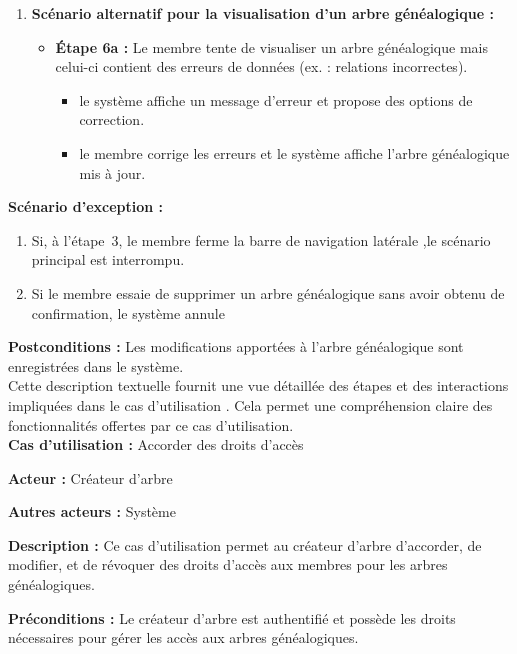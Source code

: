 \begin{enumerate}
    \item \textbf{Scénario alternatif pour la visualisation d'un arbre généalogique :}
    \begin{itemize}
        \item \textbf{Étape 6a :} Le membre tente de visualiser un arbre
          généalogique mais celui-ci contient des erreurs de données (ex. : relations incorrectes).
        \begin{itemize}
            \item le système affiche un message d'erreur et propose des options de correction.
            \item le membre corrige les erreurs et le système affiche l'arbre généalogique mis à jour.
        \end{itemize}
    \end{itemize}

\end{enumerate}

\textbf{Scénario d'exception :}
\begin{enumerate}
  \item Si, à l’étape 3, le membre ferme la barre de navigation latérale
    ,le scénario principal est interrompu.

  \item Si le membre essaie de supprimer un arbre généalogique sans avoir
    obtenu de confirmation, le système annule
\end{enumerate}

\textbf{Postconditions :} Les modifications apportées à l'arbre généalogique
sont enregistrées dans le système.
\\

Cette description textuelle fournit une vue détaillée des étapes et des
interactions impliquées dans le cas d’utilisation .
Cela permet une compréhension claire des fonctionnalités offertes par ce cas
d’utilisation.
\\

\textbf{Cas d’utilisation :} Accorder des droits d’accès

\textbf{Acteur :} Créateur d'arbre

\textbf{Autres acteurs :} Système

\textbf{Description :} Ce cas d’utilisation permet au créateur d'arbre d'accorder,
de modifier, et de révoquer des droits d'accès aux  membres pour
les arbres généalogiques.

\textbf{Préconditions :} Le créateur d'arbre est authentifié et possède les droits
nécessaires pour gérer les accès aux arbres généalogiques.


